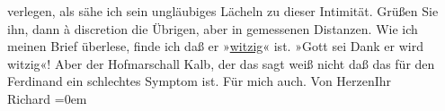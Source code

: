 \begin{ledgroupsized}[t]{13cm}
               verlegen, als sähe ich sein ungläubiges Lächeln zu dieser Intimität. Grüßen Sie ihn,
               dann à discretion die Übrigen, aber in gemessenen Distanzen.\pend
           \pstart
           Wie ich meinen Brief überlese, finde ich daß er »\uline{witzig}« ist. »Gott sei Dank er wird witzig«! Aber der
               Hofmarschall Kalb, der das sagt
               weiß nicht daß das für den Ferdinand ein schlechtes Symptom ist. Für mich auch.\pend
           \pstart
           Von Herzen\hspace*{1.5em}Ihr{\\[\baselineskip]}\spacefill\mbox{Richard}\pend
           \leftskip=0em{}
         
         \endnumbering{}\end{ledgroupsized}  \newcommand{\dateiname}{L01016}\newcommand{\titel}{Richard Beer-Hofmann an Arthur Schnitzler, 22. 2. 1900}\newcommand{\editorInnen}{Martin Anton Müller und Gerd-Hermann Susen}
      